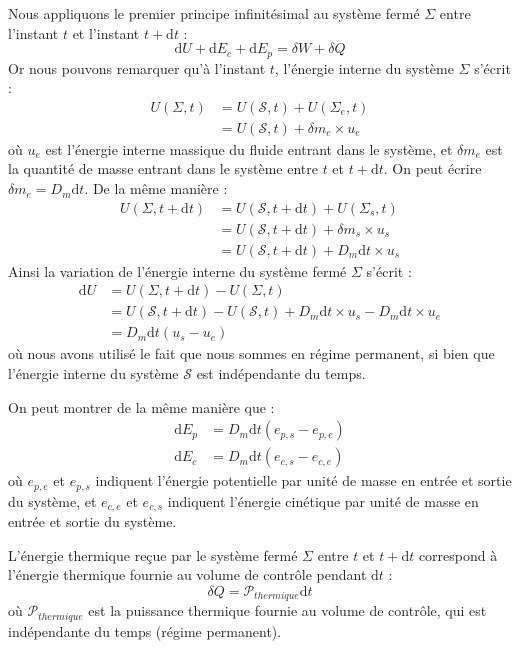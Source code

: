\documentclass[11pt,fleqn]{book} %
\newcommand{\dd}{\mathrm{d}}
\begin{document}
\begin{solution}
Nous appliquons le premier principe infinitésimal au système fermé $\Sigma$ entre l'instant $t$ et l'instant $t + \dd t$ :
\begin{equation}
    \dd U + \dd E_c + \dd E_p = \delta W + \delta Q
\end{equation}
Or nous pouvons remarquer qu'à l'instant $t$, l'énergie interne du système $\Sigma$ s'écrit :
\begin{align}
    U(\Sigma,t) &= U(\mathcal{S},t) + U(\Sigma_e,t)\\
    &= U(\mathcal{S},t) + \delta m_e \times u_e
\end{align}
où $u_e$ est l'énergie interne massique du fluide entrant dans le système, et $\delta m_e$ est la quantité de masse entrant dans le système entre $t$ et $t+\dd t$. On peut écrire $\delta m_e = D_m \dd t$.
De la même manière :
\begin{align}
    U(\Sigma,t+\dd t) &= U(\mathcal{S},t+\dd t) + U(\Sigma_s,t)\\
    &= U(\mathcal{S},t+\dd t) + \delta m_s \times u_s\\
    &= U(\mathcal{S},t+\dd t) + D_m \dd t \times u_s
\end{align}
Ainsi la variation de l'énergie interne du système fermé $\Sigma$ s'écrit :
\begin{align}
    \dd U &= U(\Sigma,t+\dd t) - U(\Sigma,t) \\
    &= U(\mathcal{S},t+\dd t) - U(\mathcal{S},t) + D_m \dd t \times u_s - D_m \dd t \times u_e \\
    &= D_m \dd t (u_s-u_e)
\end{align}
où nous avons utilisé le fait que nous sommes en régime permanent, si bien que l'énergie interne du système $\mathcal{S}$ est indépendante du temps.

On peut montrer de la même manière que :
\begin{align}
    \dd E_p &=  D_m \dd t (e_{p,s}-e_{p,e}) \\
    \dd E_c &=  D_m \dd t (e_{c,s}-e_{c,e})
\end{align}
où $e_{p,e}$ et $e_{p,s}$ indiquent l'énergie potentielle par unité de masse en entrée et sortie du système, et $e_{c,e}$ et $e_{c,s}$ indiquent l'énergie cinétique par unité de masse en entrée et sortie du système.

L'énergie thermique reçue par le système fermé $\Sigma$ entre $t$ et $t+\dd t$ correspond à l'énergie thermique fournie au volume de contrôle pendant $\dd t$ :
\begin{equation}
    \delta Q = \mathcal{P}_{thermique} \dd t
\end{equation}
où $\mathcal{P}_{thermique}$ est la puissance thermique fournie au volume de contrôle, qui est indépendante du temps (régime permanent).


\end{solution}
\end{document}
